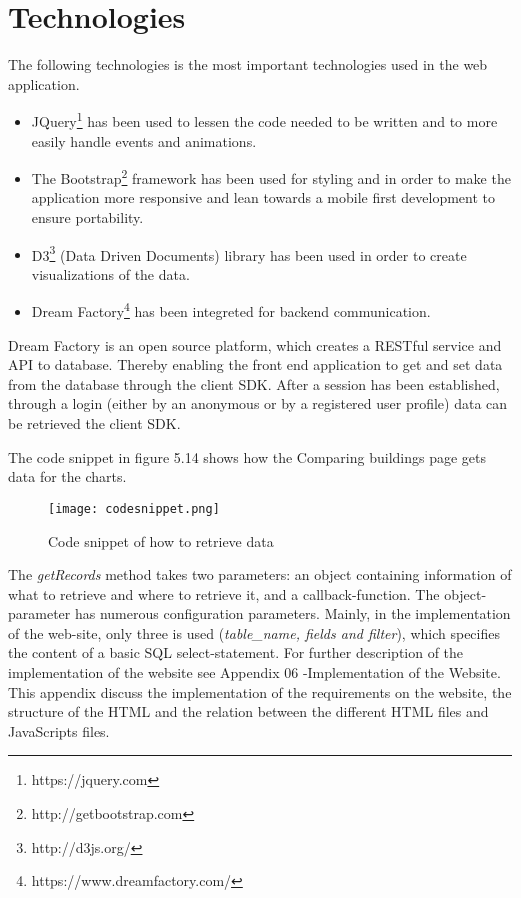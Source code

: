 \section*{Technologies}
The following technologies is the most important technologies used in the web application.
\begin{itemize}
\item JQuery\footnote{https://jquery.com} has been used to lessen the code needed to be written and to more easily handle events and animations.
\item The Bootstrap\footnote{http://getbootstrap.com} framework has been used for styling and in order to make the application more responsive and lean towards a mobile first development to ensure portability.
\item D3\footnote{http://d3js.org/} (Data Driven Documents) library has been used in order to create visualizations of the data.
\item Dream Factory\footnote{https://www.dreamfactory.com/} has been integreted for backend communication.
\end{itemize}
Dream Factory is an open source platform, which creates a RESTful service and API to database. Thereby enabling the front end application to get and set data from the database through the client SDK. 
After a session has been established, through a login (either by an anonymous or by a registered user profile) data can be retrieved the client SDK. 

The code snippet in figure 5.14 shows how the Comparing buildings page gets data for the charts.
\begin{figure}
\begin{center}
\texttt{[image: codesnippet.png]}
\end{center}
\caption{Code snippet of how to retrieve data}
\end{figure}
The \emph{getRecords} method takes two parameters: an object containing information of what to retrieve and where to retrieve it, and a callback-function.
The object-parameter has numerous configuration parameters. Mainly, in the implementation of the web-site, only three is used (\emph{table\_name, fields and filter}), which specifies the content of a basic SQL select-statement.
\newline
\newline
For further description of the implementation of the website see Appendix 06 -Implementation of the Website. This appendix discuss the implementation of the requirements on the website, the structure of the HTML and the relation between the different HTML files and JavaScripts files.



